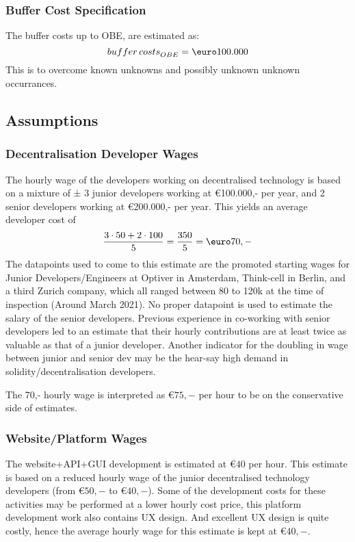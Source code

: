 \subsubsection{Buffer Cost Specification}\label{subsubsec:buffer_cost_specification}
The buffer costs up to OBE, are estimated as:
\begin{equation}
	{buffer\, costs}_{OBE}=\text{\euro}100.000
	\label{eq:buffer_costs}
\end{equation}
This is to overcome known unknowns and possibly unknown unknown occurrances.

\subsection{Assumptions}\label{subsec:assumptions}
\subsubsection{Decentralisation Developer Wages}
The hourly wage of the developers working on decentralised technology is based on a mixture of ± 3 junior developers working at \euro 100.000,- per year, and 2 senior developers working at \euro 200.000,- per year. This yields an average developer cost of
\begin{equation}
	\frac{3\cdot 50+2\cdot 100}{5}=\frac{350}{5}=\textup{\euro}70,-
\end{equation}
The datapoints used to come to this estimate are the promoted starting wages for Junior Developers/Engineers at Optiver in Amsterdam, Think-cell in Berlin, and a third Zurich company, which all ranged between 80 to 120k at the time of inspection (Around March 2021). No proper datapoint is used to estimate the salary of the senior developers. Previous experience in co-working with senior developers led to an estimate that their hourly contributions are at least twice as valuable as that of a junior developer. Another indicator for the doubling in wage between junior and senior dev may be the hear-say high demand in solidity/decentralisation developers.

The 70,- hourly wage is interpreted as \euro$75,-$ per hour to be on the conservative side of estimates.
\subsubsection{Website/Platform Wages}
The website+API+GUI development is estimated at \euro$40$ per hour. This estimate is based on a reduced hourly wage of the junior decentralised technology developers (from \euro$50,-$ to \euro$40,-$). Some of the development costs for these activities may be performed at a lower hourly cost price, this platform development work also contains UX design. And excellent UX design is quite costly, hence the average hourly wage for this estimate is kept at \euro$40,-$.

